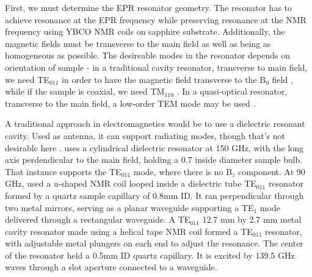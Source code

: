 First, we must determine the EPR resonator geometry. The resonator has to achieve resonance at the EPR frequency while preserving resonance at the NMR frequency using YBCO \cite{brey2006ybco} NMR coils on sapphire substrate. Additionally, the magnetic fields must be transverse to the main field as well as being as homogeneous as possible. The desireable modes in the resonator depends on orientation of sample - in a traditional cavity resonator, transverse to main field, we need TE$_{011}$ in order to have the magnetic field transverse to the B$_0$ field \cite{neugebauer2013liquid,van2014liquid}, while if the sample is coaxial, we need TM$_{110}$ \cite{griesinger2012dynamic}. In a quasi-optical resonator, transverse to the main field, a low-order TEM mode may be used \cite{denysenkov2012liquid}.


A traditional approach in electromagnetics would be to use a dielectric resonant cavity. Used as antenna, it can support radiating modes, though that's not desirable here \cite{long1983resonant}. \cite{grinberg1983electron} uses a cylindrical dielectric resonator at 150 GHz, with the long axis perdendicular to the main field, holding a 0.7 inside diameter sample bulb. That instance supports the TE$_{011}$ mode, where there is no B$_z$ component. At 90 GHz, \cite{annino2005axially, annino2010resonance} used a u-shaped NMR coil looped inside a dielectric tube TE$_{011}$ resonator formed by a quartz sample capillary of 0.8mm ID. It ran perpendicular through two metal mirrors, serving as a planar waveguide supporting a TE$_1$ mode delivered through a rectangular waveguide. A TE$_{011}$ 12.7 mm by 2.7 mm metal cavity resonator made using a helical tape NMR coil formed a TE$_{011}$ resonator, with adjustable metal plungers on each end to adjust the resonance. The center of the resonator held a 0.5mm ID quartz capillary. It is excited by 139.5 GHz waves through a slot aperture connected to a waveguide.

